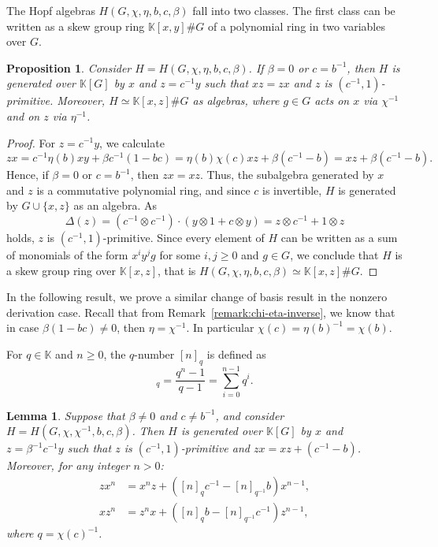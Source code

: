 \documentclass[11pt, twoside]{amsart}
\newtheorem{lemma}[theorem]{Lemma}
\newtheorem{proposition}[theorem]{Proposition}
\theoremstyle{definition}
\newcommand{\KK}{\mathbb{K}}
\begin{document}
The Hopf algebras $H(G, \chi, \eta, b, c, \beta)$ fall into two classes. The first class can be written as a skew group ring $\KK[x, y]\# G$ of a polynomial ring in two variables over $G$. 

\begin{proposition}\label{proposition:change of variables in the zero derivation case}
    Consider $H = H(G, \chi, \eta, b, c, \beta)$. If $\beta = 0$ or $c = b^{-1}$, then $H$ is generated over $\KK[G]$ by $x$ and $z = c^{-1}y$ such that $xz = zx$ and $z$ is $(c^{-1}, 1)$-primitive. Moreover, $H \simeq \KK[x, z]\# G$ as algebras, where $g \in G$ acts on $x$ via $\chi^{-1}$ and on $z$ via $\eta^{-1}$.
\end{proposition}

\begin{proof}
    For $z = c^{-1}y$, we calculate 
    \begin{equation}\label{equation:first remark}
        zx = c^{-1}\eta(b)xy + \beta c^{-1}(1 - bc) = \eta(b)\chi(c)xz + \beta (c^{-1} - b) = xz + \beta (c^{-1} - b).
    \end{equation}
    Hence, if $\beta = 0$ or $c = b^{-1}$, then $zx = xz$. Thus, the subalgebra generated by $x$ and $z$ is a commutative polynomial ring, and since $c$ is invertible, $H$ is generated by $G \cup \{x, z\}$ as an algebra. As 
    \[
        \Delta(z) = (c^{-1} \otimes c^{-1})\cdot (y \otimes 1 + c \otimes y) = z \otimes c^{-1} + 1 \otimes z
    \]
    holds, $z$ is $(c^{-1}, 1)$-primitive. Since every element of $H$ can be written as a sum of monomials of the form $x^i y^j g$ for some $i, j \geq 0$ and $g \in G$, we conclude that $H$ is a skew group ring over $\KK[x, z]$, that is $H(G, \chi, \eta, b, c, \beta) \simeq \KK[x, z]\# G$.
\end{proof}
%
In the following result, we prove a similar change of basis result in the nonzero derivation case. Recall that
 from Remark~\ref{remark:chi-eta-inverse}, we know that in case $\beta(1-bc)\neq 0$, then $\eta=\chi^{-1}$. In particular $\chi(c)=\eta(b)^{-1}=\chi(b)$.  
 
 For $q\in \KK$ and $n\geq 0$, the $q$-number $[n]_q$ is defined as 
\begin{equation}
[n]_q = \frac{q^n - 1}{q - 1} = \sum_{i=0}^{n-1} q^i.
\end{equation}

\begin{lemma}\label{lemma:change of variables in the nonzero derivation case}
    Suppose that $\beta \neq 0$ and $c \neq b^{-1}$, and consider $H = H(G, \chi, \chi^{-1}, b, c, \beta)$. 
    Then $H$ is generated over $\KK[G]$ by $x$ and $z = \beta^{-1}c^{-1}y$ such that $z$ is $(c^{-1}, 1)$-primitive and $zx = xz + (c^{-1} - b)$. Moreover, for any integer $n > 0$:
    \begin{align}
        zx^n  &= x^nz + \left( [n]_q c^{-1} - [n]_{q^{-1}} b \right)x^{n-1}, \label{equation:commutation relations 1} \\
        xz^n &= z^n x  + \left([n]_q b - [n]_{q^{-1}} c^{-1} \right)z^{n-1}, \label{equation:commutation relations 2}
    \end{align}
    where $q = \chi(c)^{-1}$.
\end{lemma}
\end{document}
